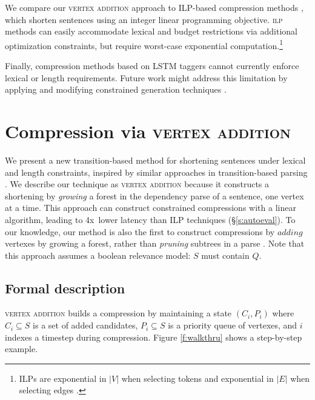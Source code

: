 \documentclass[11pt,a4paper]{article}
\newcommand{\speedup}[0]{4x~}
\begin{document}
We compare our \textsc{vertex addition} approach to ILP-based compression methods \cite{clarke2008global,filippova2013overcoming,Wang2017CanSH}, which shorten sentences using an integer linear programming objective. \textsc{ilp} methods can easily accommodate lexical and budget restrictions via additional optimization constraints, but require worst-case exponential computation.\footnote{ILPs are exponential in $|V|$ when selecting \cite{clarke2008global} tokens and exponential in $|E|$ when selecting edges \cite{filippova2015sentence}.} 

Finally, compression methods based on LSTM taggers \cite{filippova2015sentence} cannot currently enforce lexical or length requirements. Future work might address this limitation by applying and modifying constrained generation techniques \cite{D16-1140,N18-1119,D18-1443}.

\section{Compression via \textsc{vertex addition}}\label{s:system}

We present a new transition-based method for shortening sentences under lexical and length constraints, inspired by similar approaches in transition-based parsing \cite{nivre2003}. We describe our technique as \textsc{vertex addition} because it constructs a shortening by \textit{growing} a forest in the dependency parse of a sentence, one vertex at a time. This approach can construct constrained compressions with a linear algorithm, leading to \speedup lower latency than ILP techniques (\S\ref{s:autoeval}). To our knowledge, our method is also the first to construct compressions by $\textit{adding}$ vertexes by growing a forest, rather than \textit{pruning} subtrees in a parse \cite{Knight2000StatisticsBasedS,berg2011jointly,almeida2013fast,Filippova2015FastKS}. Note that this approach assumes a boolean relevance model: $S$ must contain $Q$. 

\subsection{Formal description}\label{s:formal}

\textsc{vertex addition} builds a compression by maintaining a state
$(C_i,P_i)$ where $C_i \subseteq S$ is a set of added candidates, $P_i  \subseteq S$ is a priority queue of vertexes, and $i$ indexes a timestep during compression. Figure \ref{f:walkthru} shows a step-by-step example. 
\end{document}
